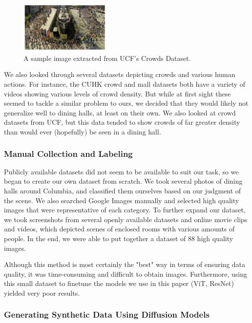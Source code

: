 \documentclass{article}
\begin{document}
\begin{multicols}{2}
\begin{figure}[H]
  \centering
  \includegraphics[width=0.4\textwidth]{ucfcrowds.png}
  \caption{A sample image extracted from UCF’s Crowds Dataset.}
  \label{fig:fig4}
\end{figure}

We also looked through several datasets depicting crowds and various human actions. For instance, the CUHK crowd and mall datasets both have a variety of videos showing various levels of crowd density. But while at first sight these seemed to tackle a similar problem to ours, we decided that they would likely not generalize well to dining halls, at least on their own. We also looked at crowd datasets from UCF, but this data tended to show crowds of far greater density than would ever (hopefully) be seen in a dining hall.

\subsubsection*{Manual Collection and Labeling}
Publicly available datasets did not seem to be available to suit our task, so we began to create our own dataset from scratch. We took several photos of dining halls around Columbia, and classified them ourselves based on our judgment of the scene. We also searched Google Images manually and selected high quality images that were representative of each category. To further expand our dataset, we took screenshots from several openly available datasets and online movie clips and videos, which depicted scenes of enclosed rooms with various amounts of people. In the end, we were able to put together a dataset of 88 high quality images.

Although this method is most certainly the "best" way in terms of ensuring data quality, it was time-consuming and difficult to obtain images. Furthermore, using this small dataset to finetune the models we use in this paper (ViT, ResNet) yielded very poor results.

\subsubsection*{Generating Synthetic Data Using Diffusion Models}


\end{multicols}
\end{document}
